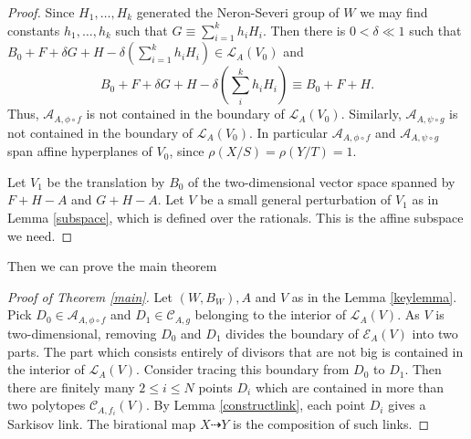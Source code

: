 \begin{proof}
  Since $H_{1},\ldots ,H_{k}$ generated the Neron-Severi group of $W$ we may find constants $h_{1},\ldots ,h_{k}$ such that $G \equiv \sum^{k}_{i=1} h_{i}H_{i}$. Then there is $0< \delta\ll 1$ such that  $B_{0}+F+\delta G+H- \delta(\sum_{i=1}^{k} h_{i}H_{i}) \in \mathcal{L}_{A}(V_{0})$ and
  \[
    B_{0}+F+\delta G+H-\delta (\sum_i^k h_{i}H_{i}) \equiv B_{0}+F+H
    .\]
  Thus, $\mathcal{A}_{A,\phi\circ f}$ is not contained in the boundary of $\mathcal{L}_{A}(V_{0})$. Similarly, $\mathcal{A}_{A,\psi\circ g}$ is not contained in the boundary of $\mathcal{L}_{A}(V_{0})$. In particular $\mathcal{A}_{A,\phi\circ f}$ and   $\mathcal{A}_{A,\psi\circ g}$ span affine hyperplanes of $V_{0}$, since $\rho(X/S)=\rho(Y/T)=1$.

  Let $V_{1}$ be the translation by $B_{0}$ of the two-dimensional vector space spanned by $F+H-A$ and $G+H-A$. Let $V$ be a small general perturbation of $V_{1}$ as in Lemma \ref{subspace}, which is defined over the rationals. This is the affine subspace we need.
\end{proof}
Then we can prove the main theorem

\begin{proof}[Proof of Theorem \ref{main}]
  Let $(W,B_{W}),A $ and $V$ as in the Lemma \ref{keylemma}.  Pick $ D_{0} \in \mathcal{A}_{A,\phi\circ f} $  and $ D_1\in \mathcal{C}_{A,g} $ belonging to the interior of $ \mathcal{L}_A(V) $. As $ V $ is two-dimensional, removing $ D_0 $ and $ D_1 $ divides the boundary of $ \mathcal{E}_A(V) $ into two parts. The part which consists entirely of divisors that are not big is contained in the interior of $ \mathcal{L}_A(V) $. Consider tracing this boundary from $ D_0 $ to $ D_1 $. Then there are finitely many $ 2\leqslant i\leqslant N $ points $ D_i $ which are contained in more than two polytopes $ \mathcal{C}_{A,f_i}(V) $. By Lemma \ref{constructlink},  each point $ D_i $ gives a Sarkisov link.  The birational map $X \dashrightarrow Y$ is the composition of such links.
\end{proof}

